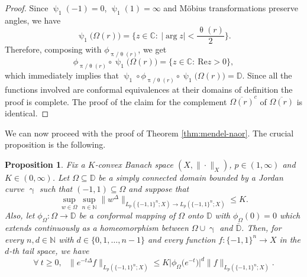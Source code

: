 \documentclass[11pt,reqno]{amsart}
\renewcommand{\leq}{\leqslant}
\renewcommand{\geq}{\geqslant}
\renewcommand{\gamma}{\upgamma}
\renewcommand{\pi}{\uppi}
\newcommand{\1}{\mathbf 1}
\newtheorem{proposition}[theorem]{Proposition}
\theoremstyle{remark}
\newcommand{\N}{\mathbb N}
\renewcommand{\theta}{\uptheta}
\renewcommand{\gamma}{\upgamma}
\renewcommand{\psi}{\uppsi}
\renewcommand{\pi}{\uppi}
\renewcommand{\pi}{\uppi}
\newcommand{\mb}{\mathbb}
\begin{document}
\begin{proof}
Since $\psi_1(-1)=0$, $\psi_1(1)=\infty$ and M\"obius transformations preserve angles, we have
\begin{equation}
\psi_1\big(\Omega(r)\big) = \Big\{ z\in\mb{C}: \ |\arg z|< \frac{\theta(r)}{2}\Big\}.
\end{equation}
Therefore, composing with $\phi_{\pi/\theta(r)}$, we get
\begin{equation}
\phi_{\pi/\theta(r)}\circ\psi_1\big(\Omega(r)\big) = \big\{z\in\mb{C}: \ \mathrm{Re} z>0\big\},
\end{equation}
which immediately implies that $\psi_1\circ \phi_{\pi/\theta(r)}\circ\psi_1\big(\Omega(r)\big)=\mb{D}$. Since all the functions involved are conformal equivalences at their domains of definition the proof is complete. The proof of the claim for the complement $\overline{\Omega(r)}^c$ of $\overline{\Omega(r)}$ is identical.
\end{proof}

We can now proceed with the proof of Theorem \ref{thm:mendel-naor}. The crucial proposition is the following.

\begin{proposition} \label{prop:crucialheat}
Fix a $K$-convex Banach space $(X,\|\cdot\|_X)$, $p\in(1,\infty)$ and $K\in(0,\infty)$. Let $\Omega\subseteq\mb{D}$ be a simply connected domain bounded by a Jordan curve $\gamma$ such that $(-1,1) \subseteq \Omega$ and suppose that
\begin{equation} \label{eq:assumppropKconv}
\sup_{w\in \Omega} \sup_{n\in\N} \|w^\Delta\|_{{L_p(\{-1,1\}^n;X)}\to {L_p(\{-1,1\}^n;X)}} \leq K.
\end{equation}
Also, let $\phi_\Omega: \Omega\to \mb{D}$ be a conformal mapping of $\Omega$ onto $\mb{D}$ with $\phi_\Omega(0)=0$ which extends continuously as a homeomorphism between $\Omega\cup\gamma$ and $\overline{\mb{D}}$. Then, for every $n,d\in\N$ with $d\in\{0,1,\ldots,n-1\}$ and every function $f:\{-1,1\}^n\to X$ in the $d$-th tail space, we have
\begin{equation}
\forall \ t\geq0, \ \ \ \|e^{-t\Delta}f\|_{L_p(\{-1,1\}^n;X)} \leq K \big|\phi_\Omega\big(e^{-t}\big)\big|^d \|f\|_{L_p(\{-1,1\}^n;X)}.
\end{equation}
\end{proposition}
\end{document}
